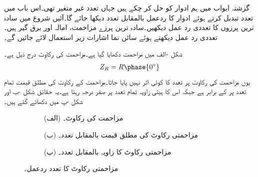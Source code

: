 گزشتہ ابواب میں ہم  ادوار کو حل کر چکے ہیں جہاں تعدد غیر متغیر تھی۔اس باب میں تعدد تبدیل کرتے ہوئے ادوار کا ردعمل بالمقابل تعدد دیکھا جائے گا۔آئیں شروع میں سادہ ترین پرزوں کا تعددی رد عمل دیکھیں۔سادہ ترین پرزے  مزاحمت، امالہ اور برق گیر ہیں۔تعددی رد عمل دیکھتے ہوئے سائن نما اشارات زیر استعمال لائے جائیں گے۔ 

شکل -الف میں مزاحمت دکھایا گیا ہے۔مزاحمت کی رکاوٹ درج ذیل ہے۔
\begin{align}
Z_R=R\phase{0^{\circ}}
\end{align}
یوں مزاحمت کی رکاوٹ پر تعدد  کا کوئی اثر نہیں پایا جاتا۔مزاحمت کے رکاوٹ کی مطلق قیمت  تمام تعدد پر  کے برابر ہے جبکہ اس کا ہیتی زاویہ  تمام تعدد پر صفر درجہ رہتا ہے۔یہ حقائق شکل -ب اور شکل -پ میں دکھائے گئے ہیں۔
\begin{figure}
\centering
\begin{subfigure}{1\textwidth}
\centering
{}
\caption*{(الف) مزاحمت کی رکاوٹ۔}
\end{subfigure}
\begin{subfigure}{0.5\textwidth}
\centering
{}%
\caption*{(ب) مزاحمتی رکاوٹ کی مطلق قیمت بالمقابل تعدد۔}
\end{subfigure}%
\begin{subfigure}{0.5\textwidth}
\centering
{}%
\caption*{(پ) مزاحمتی رکاوٹ کا زاویہ بالمقابل تعدد۔}
\end{subfigure}%
\caption{مزاحمتی رکاوٹ کا تعدد ردعمل۔}
\label{شکل_تعددی_مزاحمتی_ردعمل}
\end{figure}

